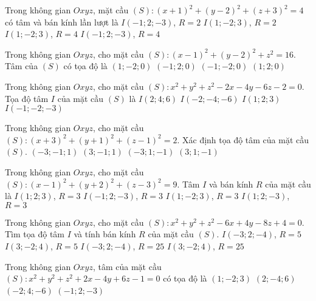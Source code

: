 \begin{ex}%
	Trong không gian $Oxyz$, mặt cầu $(S)\colon (x+1)^2+(y-2)^2+(z+3)^2=4$ có tâm và bán kính lần lượt là
	\choice
	{\True $I(-1;2;-3)$, $R=2$}
	{$I(1;-2;3)$, $R=2$}
	{$I(1;-2;3)$, $R=4$}
	{$I(-1;2;-3)$, $R=4$}
\end{ex}
\begin{ex}%
	Trong không gian $Oxyz$, cho mặt cầu $(S)\colon (x-1)^2+(y-2)^2+z^2=16$. Tâm của $(S)$ có tọa độ là
	\choice
	{$(1;-2;0)$}
	{$(-1;2;0)$}
	{$(-1;-2;0)$}
	{\True $(1;2;0)$}
\end{ex}
\begin{ex}%
	Trong không gian $Oxyz$, cho mặt cầu $(S)\colon x^2+y^2+z^2-2x-4y-6z-2=0$. Tọa độ tâm $I$ của mặt cầu $(S)$ là
	\choice
	{$I(2;4;6)$}
	{$I(-2;-4;-6)$}
	{\True $I(1;2;3)$}
	{$I(-1;-2;-3)$}
\end{ex}
\begin{ex}%
	Trong không gian $Oxyz$, cho mặt cầu $(S)\colon (x+3)^2+(y+1)^2+(z-1)^2=2$. Xác định tọa độ tâm của mặt cầu $(S)$.
	\choice
	{\True $(-3;-1;1)$}
	{$(3;-1;1)$}
	{$(-3;1;-1)$}
	{$(3;1;-1)$}
\end{ex}
\begin{ex}%
	Trong không gian $Oxyz$, cho mặt cầu $(S)\colon (x-1)^2+(y+2)^2+(z-3)^2=9$. Tâm $I$ và bán kính $R$ của mặt cầu là
	\choice
	{$I(1;2;3)$, $R=3$}
	{$I(-1;2;-3)$, $R=3$}
	{\True $I(1;-2;3)$, $R=3$}
	{$I(1;2;-3)$, $R=3$}
\end{ex}
\begin{ex}%
	Trong không gian $Oxyz$, cho mặt cầu $(S)\colon x^2+y^2+z^2-6x+4y-8z+4=0$. Tìm tọa độ tâm $I$ và tính bán kính $R$ của mặt cầu $(S)$.
	\choice
	{$I(-3;2;-4)$, $R=5$}
	{\True $I(3;-2;4)$, $R=5$}
	{$I(-3;2;-4)$, $R=25$}
	{$I(3;-2;4)$, $R=25$}
\end{ex}
\begin{ex}%
	Trong không gian $Oxyz$, tâm của mặt cầu $(S)\colon x^2+y^2+z^2+2x-4y+6z-1=0$ có tọa độ là
	\choice
	{$(1;-2;3)$}
	{$(2;-4;6)$}
	{$(-2;4;-6)$}
	{\True $(-1;2;-3)$}
\end{ex}
